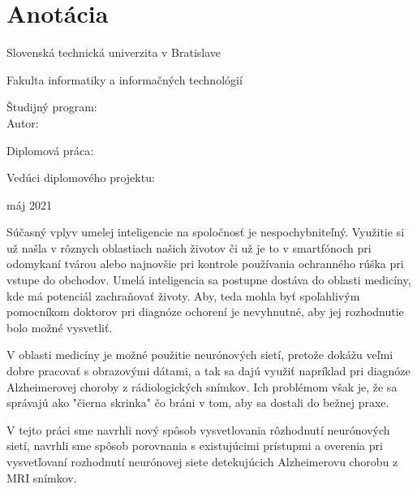 
\thispagestyle{empty}
\section*{Anotácia}

\begin{minipage}[t]{1\columnwidth}%
Slovenská technická univerzita v Bratislave

Fakulta informatiky a informačných technológií

Študijný program: \myStudyProgram\\

Autor: \myName

Diplomová práca: \myTitle

Vedúci diplomového projektu: \mySupervisor

máj 2021
\end{minipage}

\bigskip{}

Súčasný vplyv umelej inteligencie na spoločnosť je nespochybniteľný. Využitie si už našla v rôznych oblastiach našich životov či už je to v smartfónoch pri odomykaní tvárou alebo najnovšie pri kontrole používania ochranného rúška pri vstupe do obchodov. Umelá inteligencia sa postupne dostáva do oblasti medicíny, kde má potenciál zachraňovať životy. Aby, teda mohla byť spoľahlivým pomocníkom doktorov pri diagnóze ochorení je nevyhnutné, aby jej rozhodnutie bolo možné vysvetliť. 

V oblasti medicíny je možné použitie neurónových sietí, pretože dokážu veľmi dobre pracovať s obrazovými dátami, a tak sa dajú využiť napríklad pri diagnóze Alzheimerovej choroby z rádiologických snímkov. Ich problémom však je, že sa správajú ako "čierna skrinka" čo bráni v tom, aby sa dostali do bežnej praxe.

V tejto práci sme navrhli nový spôsob vysvetlovania rôzhodnutí neurónových sietí, navrhli sme spôsob porovnania s existujúcimi prístupmi a overenia pri vysvetľovaní rozhodnutí neurónovej siete detekujúcich Alzheimerovu chorobu z MRI snímkov.

\newpage
\thispagestyle{empty}
\mbox{}
\newpage